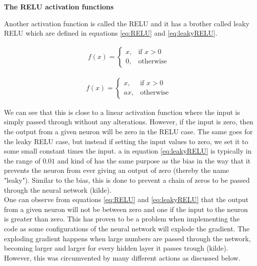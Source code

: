 \documentclass[12pt,a4paper]{article}
\begin{document}
\begin{center}
\large{\textbf{The RELU activation functions}}
\end{center}

\noindent Another activation function is called the RELU and it has a brother called leaky RELU which are defined in equations \ref{eq:RELU} and \ref{eq:leakyRELU}.

\begin{equation}\label{eq:RELU}
\begin{aligned}
f(x) = 
\begin{cases}
x,& \text{if } x > 0\\
0,& \text{otherwise}
\end{cases}
\end{aligned}
\end{equation}

\begin{equation}\label{eq:leakyRELU}
\begin{aligned}
f(x) = 
\begin{cases}
x,& \text{if } x > 0\\
ax,& \text{otherwise}
\end{cases}
\end{aligned}
\end{equation}

\noindent We can see that this is close to a linear activation function where the input is simply passed through without any alterations. However, if the input is zero, then the output from a given neuron will be zero in the RELU case. The same goes for the leaky RELU case, but instead if setting the input values to zero, we set it to some small constant times the input. a in equation \ref{eq:leakyRELU} is typically in the range of $0.01$ and kind of has the same purpose as the bias in the way that it prevents the neuron from ever giving an output of zero (thereby the name "leaky"). Similar to the bias, this is done to prevent a chain of zeros to be passed through the neural network (kilde).
\\
One can observe from equations \ref{eq:RELU} and \ref{eq:leakyRELU} that the output from a given neuron will not be between zero and one if the input to the neuron is greater than zero. This has proven to be a problem when implementing the code as some configurations of the neural network will explode the gradient. The exploding gradient happens when large numbers are passed through the network, becoming larger and larger for every hidden layer it passes trough (kilde). However, this was circumvented by many different actions as discussed below. 
\end{document}
